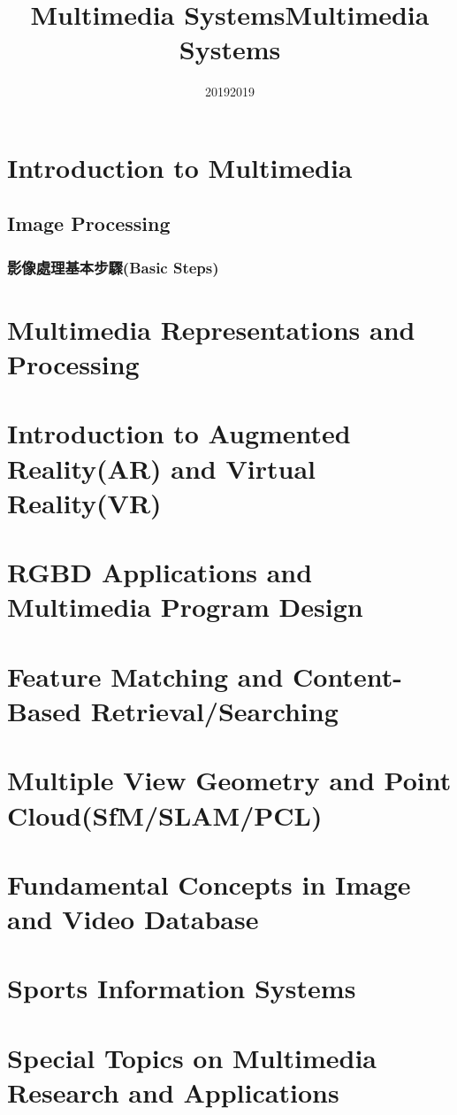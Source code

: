 \documentclass{article}
\title{Multimedia Systems}
\date{2019}
\title{Multimedia Systems}
\date{2019}
\begin{document}
\maketitle
 \section{Introduction to Multimedia}
  \subsection{Image Processing}
   \subsubsection{影像處理基本步驟(Basic Steps)}
    
 \section{Multimedia Representations and Processing}
 \section{Introduction to Augmented Reality(AR) and Virtual Reality(VR)}
 \section{RGBD Applications and Multimedia Program Design}
 \section{Feature Matching and Content-Based Retrieval/Searching}
 \section{Multiple View Geometry and Point Cloud(SfM/SLAM/PCL)}
 \section{Fundamental Concepts in Image and Video Database}
 \section{Sports Information Systems}
 \section{Special Topics on Multimedia Research and Applications}
 
\nocite{*} %


\end{document}
